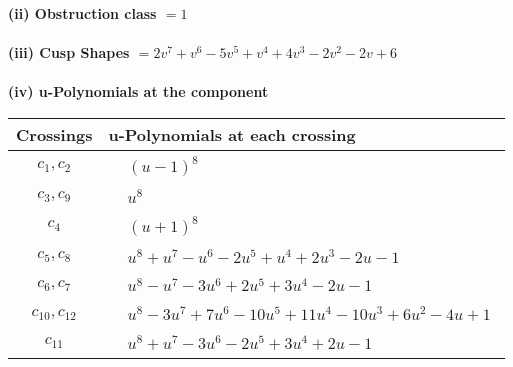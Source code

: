 \documentclass[1p]{elsarticle_modified}
\theoremstyle{definition}
\begin{document}
\flushleft \textbf{(ii) Obstruction class $= 1$}\\~\\
\flushleft \textbf{(iii) Cusp Shapes $= 2 v^7+v^6-5 v^5+v^4+4 v^3-2 v^2-2 v+6$}\\~\\
\newpage\renewcommand{\arraystretch}{1}
\flushleft \textbf{(iv) u-Polynomials at the component}\newline \\
\begin{tabular}{m{50pt}|m{274pt}}
Crossings & \hspace{64pt}u-Polynomials at each crossing \\
\hline $$\begin{aligned}c_{1},c_{2}\end{aligned}$$&$\begin{aligned}
&(u-1)^8
\end{aligned}$\\
\hline $$\begin{aligned}c_{3},c_{9}\end{aligned}$$&$\begin{aligned}
&u^8
\end{aligned}$\\
\hline $$\begin{aligned}c_{4}\end{aligned}$$&$\begin{aligned}
&(u+1)^8
\end{aligned}$\\
\hline $$\begin{aligned}c_{5},c_{8}\end{aligned}$$&$\begin{aligned}
&u^8+u^7- u^6-2 u^5+u^4+2 u^3-2 u-1
\end{aligned}$\\
\hline $$\begin{aligned}c_{6},c_{7}\end{aligned}$$&$\begin{aligned}
&u^8- u^7-3 u^6+2 u^5+3 u^4-2 u-1
\end{aligned}$\\
\hline $$\begin{aligned}c_{10},c_{12}\end{aligned}$$&$\begin{aligned}
&u^8-3 u^7+7 u^6-10 u^5+11 u^4-10 u^3+6 u^2-4 u+1
\end{aligned}$\\
\hline $$\begin{aligned}c_{11}\end{aligned}$$&$\begin{aligned}
&u^8+u^7-3 u^6-2 u^5+3 u^4+2 u-1
\end{aligned}$\\
\hline
\end{tabular}\\~\\
\end{document}
